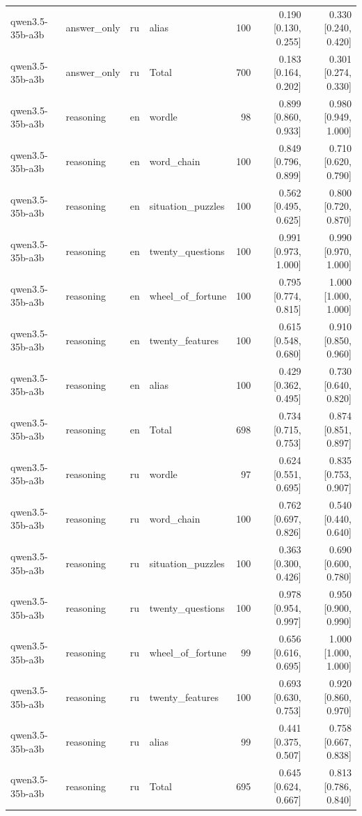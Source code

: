 \begin{longtable}{llllrrr}
qwen3.5-35b-a3b & answer\_only & ru & alias & 100 & 0.190 [0.130, 0.255] & 0.330 [0.240, 0.420] \\
qwen3.5-35b-a3b & answer\_only & ru & Total & 700 & 0.183 [0.164, 0.202] & 0.301 [0.274, 0.330] \\
qwen3.5-35b-a3b & reasoning & en & wordle & 98 & 0.899 [0.860, 0.933] & 0.980 [0.949, 1.000] \\
qwen3.5-35b-a3b & reasoning & en & word\_chain & 100 & 0.849 [0.796, 0.899] & 0.710 [0.620, 0.790] \\
qwen3.5-35b-a3b & reasoning & en & situation\_puzzles & 100 & 0.562 [0.495, 0.625] & 0.800 [0.720, 0.870] \\
qwen3.5-35b-a3b & reasoning & en & twenty\_questions & 100 & 0.991 [0.973, 1.000] & 0.990 [0.970, 1.000] \\
qwen3.5-35b-a3b & reasoning & en & wheel\_of\_fortune & 100 & 0.795 [0.774, 0.815] & 1.000 [1.000, 1.000] \\
qwen3.5-35b-a3b & reasoning & en & twenty\_features & 100 & 0.615 [0.548, 0.680] & 0.910 [0.850, 0.960] \\
qwen3.5-35b-a3b & reasoning & en & alias & 100 & 0.429 [0.362, 0.495] & 0.730 [0.640, 0.820] \\
qwen3.5-35b-a3b & reasoning & en & Total & 698 & 0.734 [0.715, 0.753] & 0.874 [0.851, 0.897] \\
qwen3.5-35b-a3b & reasoning & ru & wordle & 97 & 0.624 [0.551, 0.695] & 0.835 [0.753, 0.907] \\
qwen3.5-35b-a3b & reasoning & ru & word\_chain & 100 & 0.762 [0.697, 0.826] & 0.540 [0.440, 0.640] \\
qwen3.5-35b-a3b & reasoning & ru & situation\_puzzles & 100 & 0.363 [0.300, 0.426] & 0.690 [0.600, 0.780] \\
qwen3.5-35b-a3b & reasoning & ru & twenty\_questions & 100 & 0.978 [0.954, 0.997] & 0.950 [0.900, 0.990] \\
qwen3.5-35b-a3b & reasoning & ru & wheel\_of\_fortune & 99 & 0.656 [0.616, 0.695] & 1.000 [1.000, 1.000] \\
qwen3.5-35b-a3b & reasoning & ru & twenty\_features & 100 & 0.693 [0.630, 0.753] & 0.920 [0.860, 0.970] \\
qwen3.5-35b-a3b & reasoning & ru & alias & 99 & 0.441 [0.375, 0.507] & 0.758 [0.667, 0.838] \\
qwen3.5-35b-a3b & reasoning & ru & Total & 695 & 0.645 [0.624, 0.667] & 0.813 [0.786, 0.840] \\
\end{longtable}

